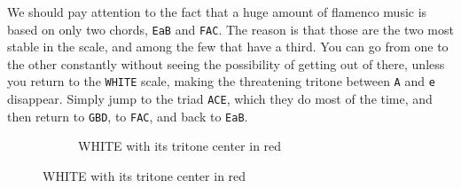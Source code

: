 \documentclass[]{report}
\begin{document}
We should pay attention to the fact that a huge amount of flamenco music is based on only two chords, \texttt{EaB} and \texttt{FAC}. The reason is that those are the two most stable in the scale, and among the few that have a third. You can go from one to the other constantly without seeing the possibility of getting out of there, unless you return to the \texttt{WHITE} scale, making the threatening tritone between \texttt{A} and \texttt{e} disappear. Simply jump to the triad \texttt{ACE}, which they do most of the time, and then return to \texttt{GBD}, to \texttt{FAC}, and back to \texttt{EaB}.
\begin{figure}[H]
	\begin{subfigure}{.31\textwidth}
		\centering
		\caption{\textsf{WHITE} with its tritone center in red}
		\captionsetup{width=\textwidth}


\end{subfigure}
\end{figure}
\end{document}
